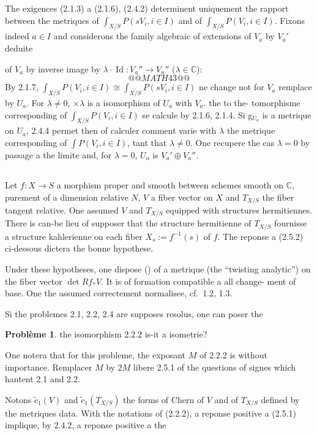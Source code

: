 \documentclass[12pt,a4paper]{article}
\theoremstyle{plain}
\theoremstyle{definition}
\newtheorem{probleme}[theorem]{Probl\`eme}
\DeclareMathOperator{\Id}{Id}
\newcommand{\CC}{\mathbb{C}}
\begin{document}
The exigences (2.1.3) a (2.1.6), (2.4.2) determinent uniquement the rapport
between the metriques of $\int_{X/S} P(sV_i, i \in I)$ and of $\int_{X/S} P(V_i, i \in I)$. Fixons indeed
$a \in I$ and considerons the family algebraic of extensions of $V_a$ by $V_a'$ deduite

of $V_a$ by inverse image by $\lambda \cdot \Id: V_a'' \to V_a''$ ($\lambda \in \CC$):
\[
@@MATH43@@
\]
By 2.1.7, $\int_{X/S} P(V_i, i \in I) \cong \int_{X/S} P(sV_i, i \in I)$ ne change not for $V_a$ remplace
by $U_a$. For $\lambda \neq 0$, $\times \lambda$ is a isomorphism of $U_a$ with $V_a$. the to the-
tomorphisme corresponding of $\int_{X/S} P(V_i, i \in I)$ se calcule by 2.1.6, 2.1.4. Si
g$_{U_a}$ is a metrique on $U_a$, 2.4.4 permet then of calculer comment varie
with $\lambda$ the metrique corresponding of $\int P(V_i, i \in I)$, tant that $\lambda \neq 0$. One
recupere the cas $\lambda = 0$ by passage a the limite and, for $\lambda = 0$, $U_a$ is
$V_a' \oplus V_a''$.

\subsection{}

Let $f: X \to S$ a morphism proper and smooth between schemes smooth on $\CC$,
purement of a dimension relative $N$, $V$ a fiber vector on $X$ and $T_{X/S}$ the
fiber tangent relative. One assumed $V$ and $T_{X/S}$ equipped with structures hermitiennes.
There is can-be lieu of supposer that the structure hermitienne of $T_{X/S}$ fournisse
a structure kahlerienne on each fiber $X_s := f^{-1}(s)$ of $f$. The reponse a
(2.5.2) ci-dessous dictera the bonne hypothese.

Under these hypotheses, one dispose (\cite{14}) of a metrique (the ``twisting analytic'')
on the fiber vector $\det Rf_* V$. It is of formation compatible a all change-
ment of base. One the assumed correctement normalisee, cf.~1.2, 1.3.

Si the problemes 2.1, 2.2, 2.4 are supposes resolus, one can poser the

\begin{probleme}
the isomorphism 2.2.2 is-it a isometrie?
\end{probleme}

One notera that for this probleme, the exposant $M$ of 2.2.2 is without importance.
Remplacer $M$ by $2M$ libere 2.5.1 of the questions of signes which hantent 2.1 and
2.2.

Notons $\tilde{c}_1(V)$ and $\tilde{c}_1(T_{X/S})$ the forms of Chern of $V$ and of $T_{X/S}$ defined
by the metriques data. With the notations of (2.2.2), a reponse positive
a (2.5.1) implique, by 2.4.2, a reponse positive a the
\end{document}
